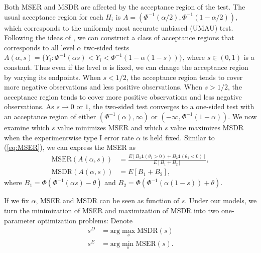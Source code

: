 \documentclass[11pt]{article}
\begin{document}
Both MSER and MSDR are affected by the acceptance region of the test. The usual acceptance region for each $H_i$ is $A = (\Phi^{-1}(\alpha/2),  \Phi^{-1}(1-\alpha/2))$, which corresponds to the uniformly most accurate unbiased (UMAU) test. Following the ideas of \citet{yu2016adaptive}, we can construct a class of acceptance regions that corresponds to all level $\alpha$ two-sided tests $	A(\alpha,s) = \{Y_i:  \Phi^{-1}(\alpha s)<Y_i< \Phi^{-1}(1-\alpha(1-s)) \}$,
where $s \in (0,1)$ is a constant. Thus even if the level $\alpha$ is fixed, we can change the acceptance region by varying its endpoints. When $s<1/2$, the acceptance region tends to cover more negative observations and less positive observations. When $s>1/2$, the acceptance region tends to cover more positive observations and less negative observations. As $s \to 0$ or $1$, the two-sided test converges to a one-sided test with an acceptance region of either $( \Phi^{-1}(\alpha), \infty)$ or $(-\infty,  \Phi^{-1}(1-\alpha)) $. We now examine which $s$ value minimizes MSER and which $s$ value maximizes MSDR when the experimentwise type I error rate $\alpha$ is held fixed.  Similar to (\ref{eq:MSER}), we can express the MSER as 
\begin{equation*}
	\begin{split}
		\text{MSER}(A(\alpha,s)) &= \frac{E[B_1\textbf{1}(\theta_1 > 0)+B_2\textbf{1}(\theta_1 < 0)]}{ E[B_1 + B_2]}, \\
		\text{MSDR}(A(\alpha,s)) & = E[B_1 + B_2],
	\end{split}
\end{equation*}
where $B_1 =\Phi(\Phi^{-1}(\alpha s)-\theta)$ and $B_2=\Phi(\Phi^{-1}(\alpha(1-s))+\theta)$.

If we fix $\alpha$, MSER and MSDR can be seen as function of $s$. Under our models, we turn the minimization of MSER and maximization of MSDR into two one-parameter optimization problems: Denote
\begin{equation*}
	\begin{split}
		s^D &= \text{arg} \max_s \text{MSDR}(s) \\
		s^E &= \text{arg} \min_s \text{MSER}(s).
	\end{split}
\end{equation*}
\end{document}
